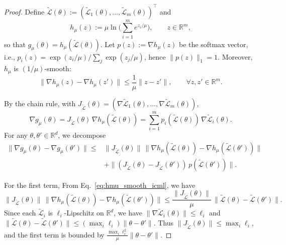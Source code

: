\documentclass[10pt,a4paper]{amsart}
\renewcommand{\footnote}[1]{}
\begin{document}
\begin{proof}
Define $\boldsymbol{\tilde{\mathcal{L}}}(\theta):=(\tilde{\mathcal{L}}_1(\theta),\ldots,\tilde{\mathcal{L}}_m(\theta))^\top$ and
\[
h_\mu(z):=\mu\ln\Big(\sum_{i=1}^m e^{z_i/\mu}\Big),\qquad z\in\mathbb{R}^m,
\]
so that $g_\mu(\theta)=h_\mu(\boldsymbol{\tilde{\mathcal{L}}}(\theta))$. Let $p(z):=\nabla h_\mu(z)$ be the softmax vector, i.e.,
$p_i(z)=\exp(z_i/\mu)/\sum_{j}\exp(z_j/\mu)$, hence $\|p(z)\|_1=1$.
Moreover, $h_\mu$ is $(1/\mu)$-smooth:
\begin{equation}\label{eq:hmu_smooth_icml}
\|\nabla h_\mu(z)-\nabla h_\mu(z')\|\le \frac{1}{\mu}\|z-z'\|,\qquad \forall z,z'\in\mathbb{R}^m .
\end{equation}

By the chain rule, with $J_{\boldsymbol{\tilde{\mathcal{L}}}}(\theta)=(\nabla \tilde{\mathcal{L}}_1(\theta),\ldots,\nabla \tilde{\mathcal{L}}_m(\theta))$,
\[
\nabla g_\mu(\theta)=J_{\boldsymbol{\tilde{\mathcal{L}}}}(\theta)\,\nabla h_\mu(\boldsymbol{\tilde{\mathcal{L}}}(\theta))
=\sum_{i=1}^m p_i(\boldsymbol{\tilde{\mathcal{L}}}(\theta))\,\nabla \tilde{\mathcal{L}}_i(\theta).
\]
For any $\theta,\theta'\in \mathbb{R}^d$, we decompose
\begin{align*}
\|\nabla g_\mu(\theta)-\nabla g_\mu(\theta')\|
\le& \|J_{\boldsymbol{\tilde{\mathcal{L}}}}(\theta)\|\,\|\nabla h_\mu(\boldsymbol{\tilde{\mathcal{L}}}(\theta))-\nabla h_\mu(\boldsymbol{\tilde{\mathcal{L}}}(\theta'))\| \\ 
&+ \|(J_{\boldsymbol{\tilde{\mathcal{L}}}}(\theta)-J_{\boldsymbol{\tilde{\mathcal{L}}}}(\theta'))\,p(\boldsymbol{\tilde{\mathcal{L}}}(\theta'))\|.
\end{align*}

For the first term, From Eq.~\eqref{eq:hmu_smooth_icml}, we have
\[
\|J_{\boldsymbol{\tilde{\mathcal{L}}}}(\theta)\|\,\|\nabla h_\mu(\boldsymbol{\tilde{\mathcal{L}}}(\theta))-\nabla h_\mu(\boldsymbol{\tilde{\mathcal{L}}}(\theta'))\|
\le \frac{\|J_{\boldsymbol{\tilde{\mathcal{L}}}}(\theta)\|}{\mu}\,\|\boldsymbol{\tilde{\mathcal{L}}}(\theta)-\boldsymbol{\tilde{\mathcal{L}}}(\theta')\|.
\]
Since each $\tilde{\mathcal{L}}_i$ is $\ell_i$-Lipschitz on $\mathbb{R}^d$, we have
$\|\nabla \tilde{\mathcal{L}}_i(\theta)\|\le \ell_i$ and $\|\boldsymbol{\tilde{\mathcal{L}}}(\theta)-\boldsymbol{\tilde{\mathcal{L}}}(\theta')\|\le (\max_i \ell_i)\|\theta-\theta'\|$.
Thus $\|J_{\boldsymbol{\tilde{\mathcal{L}}}}(\theta)\|\le \max_i \ell_i$, and the first term is bounded by
$\frac{\max_i \ell_i^2}{\mu}\|\theta-\theta'\|$.


\end{proof}
\end{document}
